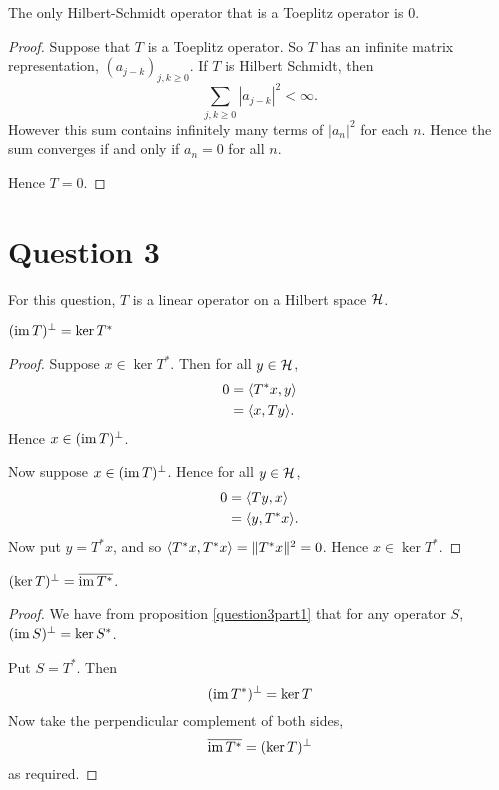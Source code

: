 \documentclass{unswmaths}
\begin{document}
\begin{theorem}
    The only Hilbert-Schmidt operator that is a Toeplitz operator
    is $0$.
\end{theorem}
\begin{proof}
    Suppose that $T$ is a Toeplitz operator. So $T$ has an infinite matrix
    representation, $(a_{j-k})_{j,k\geq 0}$. If $T$ is Hilbert Schmidt, then
    \begin{equation*}
        \sum_{j,k\geq 0} |a_{j-k}|^2 < \infty.
    \end{equation*}
    However this sum contains infinitely many terms of $|a_n|^2$ for each $n$.
    Hence the sum converges if and only if $a_n = 0$ for all $n$.
    
    Hence $T = 0$.
\end{proof} 
\section*{Question 3}
For this question, $T$ is a linear operator
on a Hilbert space $\mathcal{H}$.
\begin{proposition}
\label{question3part1}
    $(\operatorname{im} T)^\perp = \ker T^*$
\end{proposition}
\begin{proof}
    Suppose $x \in \ker T^*$. Then for all $y \in \mathcal{H}$,
    \begin{align*}
        0 &= \langle T^*x,y\rangle\\
          &= \langle x,Ty\rangle.
    \end{align*}
    Hence $x \in (\operatorname{im} T)^\perp$. 
    
    Now suppose $x \in (\operatorname{im} T)^\perp$. Hence for all
    $y \in \mathcal{H}$, 
    \begin{align*}
        0 &= \langle Ty,x\rangle\\
        &= \langle y,T^*x\rangle.
    \end{align*}
    Now put $y = T^*x$, and so $\langle T^*x,T^*x\rangle = \| T^*x\|^2 = 0$. Hence
    $x \in \ker T^*$.
\end{proof}
\begin{proposition}
    $(\ker T)^\perp = \overline{\operatorname{im} T^*}$.
\end{proposition}
\begin{proof}
    We have from proposition \ref{question3part1} that for
    any operator $S$, $(\operatorname{im} S)^\perp = \ker S^*$.
    
    Put $S = T^*$. Then
    \begin{equation*}
        (\operatorname{im} T^*)^\perp = \ker T
    \end{equation*}
    Now take the perpendicular complement of both
    sides,
    \begin{equation*}
        \overline{\operatorname{im} T^*} = (\ker T)^\perp
    \end{equation*}
    as required.
\end{proof}
\end{document}

